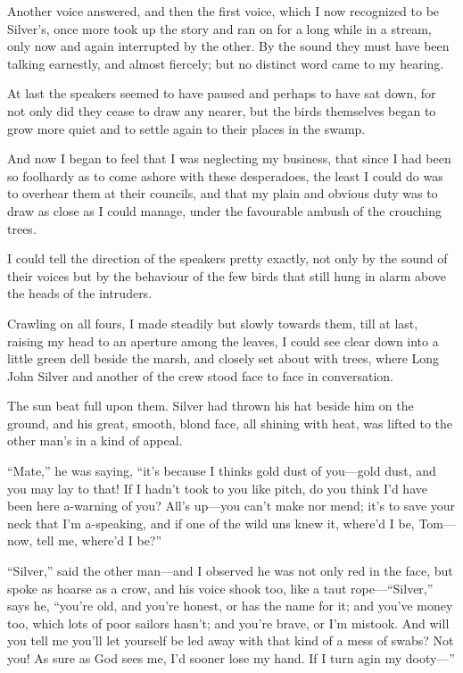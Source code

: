 Another voice answered, and then the first voice, which I now recognized to be Silver’s, once more took up the story and ran on for a long while in a stream, only now and again interrupted by the other. By the sound they must have been talking earnestly, and almost fiercely; but no distinct word came to my hearing.

At last the speakers seemed to have paused and perhaps to have sat down, for not only did they cease to draw any nearer, but the birds themselves began to grow more quiet and to settle again to their places in the swamp.

And now I began to feel that I was neglecting my business, that since I had been so foolhardy as to come ashore with these desperadoes, the least I could do was to overhear them at their councils, and that my plain and obvious duty was to draw as close as I could manage, under the favourable ambush of the crouching trees.

I could tell the direction of the speakers pretty exactly, not only by the sound of their voices but by the behaviour of the few birds that still hung in alarm above the heads of the intruders.

Crawling on all fours, I made steadily but slowly towards them, till at last, raising my head to an aperture among the leaves, I could see clear down into a little green dell beside the marsh, and closely set about with trees, where Long John Silver and another of the crew stood face to face in conversation.

The sun beat full upon them. Silver had thrown his hat beside him on the ground, and his great, smooth, blond face, all shining with heat, was lifted to the other man’s in a kind of appeal.

\enquote{Mate,} he was saying, \enquote{it’s because I thinks gold dust of you---gold dust, and you may lay to that! If I hadn’t took to you like pitch, do you think I’d have been here a-warning of you? All’s up---you can’t make nor mend; it’s to save your neck that I’m a-speaking, and if one of the wild uns knew it, where’d I be, Tom---now, tell me, where’d I be?}

\enquote{Silver,} said the other man---and I observed he was not only red in the face, but spoke as hoarse as a crow, and his voice shook too, like a taut rope---\enquote{Silver,} says he, \enquote{you’re old, and you’re honest, or has the name for it; and you’ve money too, which lots of poor sailors hasn’t; and you’re brave, or I’m mistook. And will you tell me you’ll let yourself be led away with that kind of a mess of swabs? Not you! As sure as God sees me, I’d sooner lose my hand. If I turn agin my dooty---}

